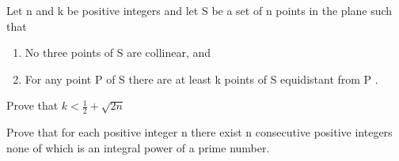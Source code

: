

\item Let n and k be positive integers and let S be a set of n points in the plane such
that
\begin{enumerate}
\item No three points of S are collinear, and
\item For any point P of S there are at least k points of S equidistant from P .
\end{enumerate}
Prove that $k < \frac{1}{2} + \sqrt{2n}$

\item Prove that for each positive integer n there exist n consecutive positive integers
none of which is an integral power of a prime number.



















